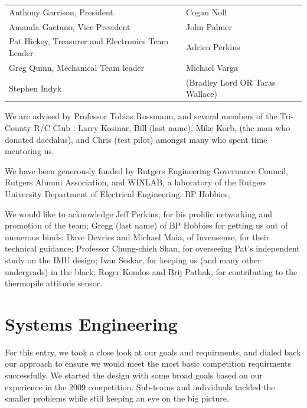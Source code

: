 \documentclass[10pt]{report}
\begin{document}
\begin{tabular}{l l}
Anthony Garrison, President & Cogan Noll \\
Amanda Gaetano, Vice President & John Palmer\\
Pat Hickey, Treasurer and Electronics Team Leader & Adrien Perkins\\
Greg Quinn, Mechanical Team leader & Michael Varga\\
Stephen Indyk & (Bradley Lord OR Taras Wallace)\\
\end{tabular}

\vspace{24 pt}


We are advised by
 Professor Tobias Rossmann,
 and several members of the Tri-County R/C Club \cite{tricountyRC}:
 Larry Kosinar,
 Bill (last name),
 Mike Korb,
 (the man who donated daedalus), and
 Chris (test pilot) amongst many who spent time mentoring us.

We have been generously funded by 
Rutgers Engineering Governance Council,
Rutgers Alumni Association, and
WINLAB, a laboratory of the Rutgers University Department of Electrical Engineering.
BP Hobbies, 

We would like to acknowledge
Jeff Perkins, for his prolific networking and promotion of the team;
Gregg (last name) of BP Hobbies for getting us out of numerous binds;
Dave Devries and Michael Maia, of Invensense, for their technical guidance;
Professor Chung-chieh Shan, for overseeing Pat's independent study on the IMU design;
Ivan Seskar, for keeping us (and many other undergrads) in the black;
Roger Kondos and Brij Pathak, for contributing to the thermopile attitude sensor.

\section{Systems Engineering}

For this entry, we took a close look at our goals and requirments, and dialed back our approach to ensure we would meet the most basic competition requirments successfully.
We started the design with some broad goals based on our experience in the 2009 competition. 
Sub-teams and individuals tackled the smaller problems while still keeping an eye on the big picture. 
\end{document}
